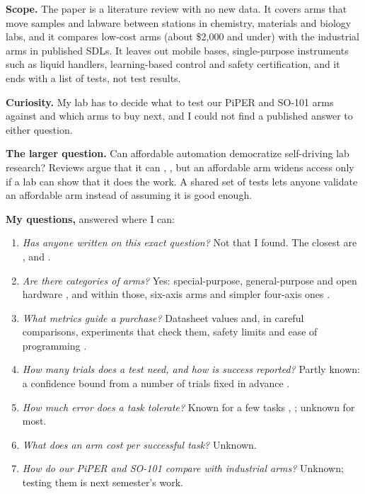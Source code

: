 \textbf{Scope.} The paper is a literature review with no new data. It covers arms that move
samples and labware between stations in chemistry, materials and biology labs, and it compares
low-cost arms (about \$2{,}000 and under) with the industrial arms in published SDLs. It leaves
out mobile bases, single-purpose instruments such as liquid handlers, learning-based control and
safety certification, and it ends with a list of tests, not test results.

\textbf{Curiosity.} My lab has to decide what to test our PiPER and SO-101 arms against and
which arms to buy next, and I could not find a published answer to either question.

\textbf{The larger question.} Can affordable automation democratize self-driving lab research?
Reviews argue that it can \cite{tom2024}, \cite{doloi2025}, but an affordable arm widens access
only if a lab can show that it does the work. A shared set of tests lets anyone validate an
affordable arm instead of assuming it is good enough.

\textbf{My questions,} answered where I can:
\begin{enumerate}[1.]
  \item \emph{Has anyone written on this exact question?} Not that I found. The closest are
    \cite{harazono2024}, \cite{zhou2025} and \cite{ferraguti2019}.
  \item \emph{Are there categories of arms?} Yes: special-purpose, general-purpose and open
    hardware \cite{tom2024}, and within those, six-axis arms and simpler four-axis ones
    \cite{rupp2022}.
  \item \emph{What metrics guide a purchase?} Datasheet values and, in careful comparisons,
    experiments that check them, safety limits and ease of programming \cite{ferraguti2019}.
  \item \emph{How many trials does a test need, and how is success reported?} Partly known: a
    confidence bound from a number of trials fixed in advance \cite{vincent2024}.
  \item \emph{How much error does a task tolerate?} Known for a few tasks \cite{burger2020},
    \cite{harazono2024}; unknown for most.
  \item \emph{What does an arm cost per successful task?} Unknown.
  \item \emph{How do our PiPER and SO-101 compare with industrial arms?} Unknown; testing them
    is next semester's work.
\end{enumerate}


